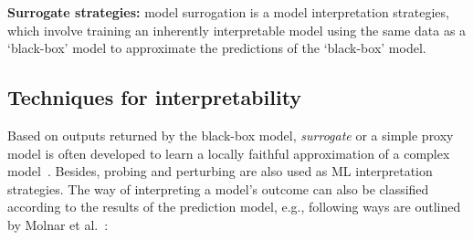 \vspace{2mm}
\begin{tcolorbox}[colback=white!3!white,colframe=gray!120!black,title=\faBook~Model surrogate]
    \scriptsize{
        \textbf{Surrogate strategies:} model surrogation is a model interpretation strategies, which involve training an inherently interpretable model using the same data as a `black-box' model to approximate the predictions of the `black-box' model. }
\end{tcolorbox}

\subsection{Techniques for interpretability}
Based on outputs returned by the black-box model, \textit{surrogate} or a simple proxy model is often developed to learn a locally faithful approximation of a complex model~\cite{stiglic2020interpretability}. Besides, probing and perturbing are also used as ML interpretation strategies. The way of interpreting a model's outcome can also be classified according to the results of the prediction model, e.g., following ways are outlined by Molnar et al.~\cite{molnar2019interpretable}:

